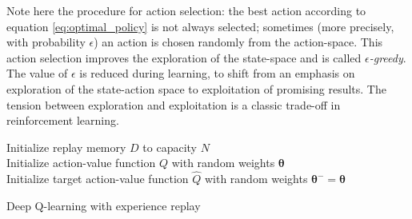 Note here the procedure for action selection: the best action according to equation \ref{eq:optimal_policy} is not always selected; sometimes (more precisely, with probability $\epsilon$) an action is chosen randomly from the action-space. This action selection improves the exploration of the state-space and is called \emph{$\epsilon$-greedy}. The value of $\epsilon$ is reduced during learning, to shift from an emphasis on exploration of the state-action space to exploitation of promising results. The tension between exploration and exploitation is a classic trade-off in reinforcement learning.

\begin{algorithm}[H]
\SetAlgoLined
Initialize replay memory $D$ to capacity $N$\\
Initialize action-value function $Q$ with random weights $\bm{\theta}$\\
Initialize target action-value function $\hat{Q}$ with random weights $\bm{\theta}^- = \bm{\theta}$\\
 \caption{Deep Q-learning with experience replay}
 \label{algo:deep_q}
\end{algorithm}

